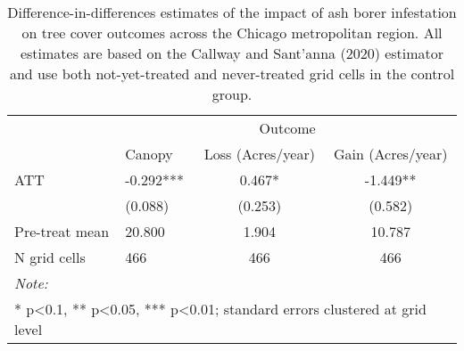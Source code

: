 \begin{table}[!h]

\caption{\label{tab:grid-tree-table}Difference-in-differences estimates of the impact of ash borer infestation on tree cover outcomes across the Chicago metropolitan region. All estimates are based on the Callway and Sant'anna (2020) estimator and use both not-yet-treated and never-treated grid cells in the control group.}
\centering
\begin{tabular}[t]{llcc}
\toprule
\multicolumn{1}{c}{ } & \multicolumn{3}{c}{Outcome} \\
\cmidrule(l{3pt}r{3pt}){2-4}
  & Canopy & Loss (Acres/year) & Gain (Acres/year)\\
\midrule
ATT & -0.292*** & 0.467* & -1.449**\\
 & (0.088) & (0.253) & (0.582)\\
\midrule
Pre-treat mean & 20.800 & 1.904 & 10.787\\
N grid cells & 466 & 466 & 466\\
\bottomrule
\multicolumn{4}{l}{\rule{0pt}{1em}\textit{Note: }}\\
\multicolumn{4}{l}{\rule{0pt}{1em}* p<0.1, ** p<0.05, *** p<0.01; standard errors clustered at grid level}\\
\end{tabular}
\end{table}
